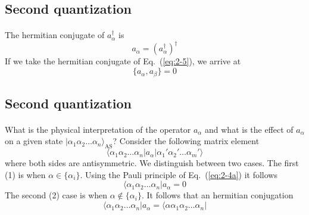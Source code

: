 \documentclass[%
twoside,                 %
final,                   %
10pt]{article}
\begin{document}
\subsection*{Second quantization}

\paragraph{}
The hermitian conjugate  of $a_\alpha^{\dagger}$ is
\begin{equation}
	a_{\alpha} = ( a_{\alpha}^{\dagger} )^{\dagger} \label{eq:2-6}
\end{equation}
If we take the hermitian conjugate of Eq.~(\ref{eq:2-5}), we arrive at 
\begin{equation}
	\{a_{\alpha},a_{\beta}\} = 0 \label{eq:2-7}
\end{equation}




\subsection*{Second quantization}

\paragraph{}
What is the physical interpretation of the operator $a_\alpha$ and what is the effect of 
$a_\alpha$ on a given state $|\alpha_1\alpha_2\dots\alpha_n\rangle_{\mathrm{AS}}$? 
Consider the following matrix element
\begin{equation}
	\langle\alpha_1\alpha_2 \dots \alpha_n|a_\alpha|\alpha_1'\alpha_2' \dots \alpha_m'\rangle \label{eq:2-8}
\end{equation}
where both sides are antisymmetric. We  distinguish between two cases. The first (1) is when
$\alpha \in \{\alpha_i\}$. Using the Pauli principle of Eq.~(\ref{eq:2-4a}) it follows
\begin{equation}
		\langle\alpha_1\alpha_2 \dots \alpha_n|a_\alpha = 0 \label{eq:2-9a}
\end{equation}
The second (2) case is when $\alpha \notin \{\alpha_i\}$. It follows that an hermitian conjugation
\begin{equation}
		\langle \alpha_1\alpha_2 \dots \alpha_n|a_\alpha = \langle\alpha\alpha_1\alpha_2 \dots \alpha_n|  \label{eq:2-9b}
\end{equation}
\end{document}
